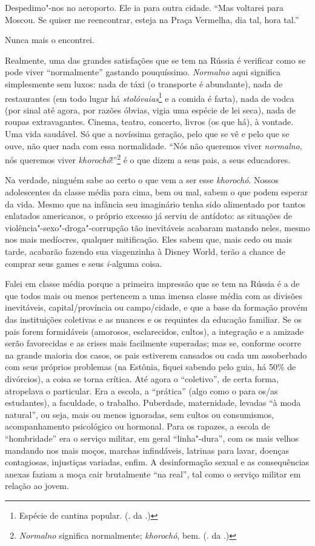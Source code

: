 Despedimo"-nos no aeroporto. Ele ia para outra cidade. ``Mas voltarei para Moscou. Se quiser me reencontrar, esteja na Praça Vermelha, dia tal, hora tal.''

Nunca mais o encontrei.

Realmente, uma das grandes satisfações que se tem na Rússia é verificar como se pode viver ``normalmente'' gastando pouquíssimo. \emph{Normalno} aqui significa simplesmente sem luxos: nada de táxi (o transporte é abundante), nada de restaurantes (em todo lugar há \emph{stolóvaias}\footnote{Espécie de cantina popular. (. da .)} e a comida é farta), nada de vodca (por sinal até agora, por razões óbvias, vigia uma espécie de lei seca), nada de roupas extravagantes. Cinema, teatro, concerto, livros (os que há), à vontade. Uma vida saudável. Só que a novíssima geração, pelo que se vê e pelo que se ouve, não quer nada com essa normalidade. ``Nós não queremos viver \emph{normalno}, nós queremos viver \emph{khorochó}!''\footnote{\emph{Normalno} significa normalmente; \emph{khorochó}, bem. (. da .)} é o que dizem a seus pais, a seus educadores.

Na verdade, ninguém sabe ao certo o que vem a ser esse \emph{khorochó}. Nossos adolescentes da classe média para cima, bem ou mal, sabem o que podem esperar da vida. Mesmo que na infância seu imaginário tenha sido alimentado por tantos enlatados americanos, o próprio excesso já serviu de antídoto: as situações de violência"-sexo"-droga"-corrupção tão inevitáveis acabaram matando neles, mesmo nos mais medíocres, qualquer mitificação. Eles sabem que, mais cedo ou mais tarde, acabarão fazendo sua viagenzinha à Disney World, terão a chance de comprar seus games e seus \emph{i-}alguma coisa.

Falei em classe média porque a primeira impressão que se tem na Rússia é a de que todos mais ou menos pertencem a uma imensa classe média com as divisões inevitáveis, capital/província ou campo/cidade, e que a base da formação provém das instituições coletivas e as nuances e os requintes da educação familiar. Se os pais forem formidáveis (amorosos, esclarecidos, cultos), a integração e a amizade serão favorecidas e as crises mais facilmente superadas; mas se, conforme ocorre na grande maioria dos casos, os pais estiverem cansados ou cada um assoberbado com seus próprios problemas (na Estônia, fiquei sabendo pelo guia, há 50\% de divórcios), a coisa se torna crítica. Até agora o ``coletivo'', de certa forma, atropelava o particular. Era a escola, a ``prática'' (algo como o  para os/as estudantes), a faculdade, o trabalho. Puberdade, maternidade, levadas ``à moda natural'', ou seja, mais ou menos ignoradas, sem cultos ou consumismos, acompanhamento psicológico ou hormonal. Para os rapazes, a escola de ``hombridade'' era o serviço militar, em geral ``linha"-dura'', com os mais velhos mandando nos mais moços, marchas infindáveis, latrinas para lavar, doenças contagiosas, injustiças variadas, enfim. A desinformação sexual e as consequências anexas faziam a moça cair brutalmente ``na real'', tal como o serviço militar em relação ao jovem.

